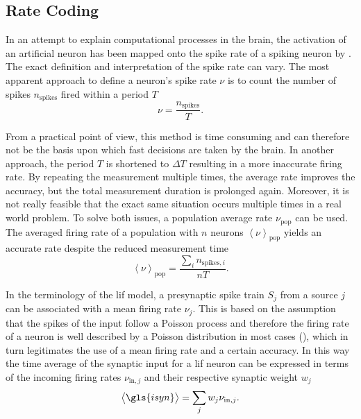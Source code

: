 \subsection{Rate Coding}
\label{ratecoding}
In an attempt to explain computational processes in the brain, the activation of an artificial neuron has been mapped onto the spike rate of a spiking neuron by \citealp{rieke1999spikes}. The exact definition and interpretation of the spike rate can vary. The most apparent approach to define a neuron's spike rate $\nu$ is to count the number of spikes $n_\text{spikes}$ fired within a period $T$
\begin{equation*}
\nu = \frac{n_\text{spikes}}{T}.
\label{eqratecoding}
\end{equation*}


From a practical point of view, this method is time consuming and can therefore not be the basis upon which fast decisions are taken by the brain. In another approach, the period $T$ is shortened to $\Delta T$ resulting in a more inaccurate firing rate. By repeating the measurement multiple times, the average rate improves the accuracy, but the total measurement duration is prolonged again. Moreover, it is not really feasible that the exact same situation occurs multiple times in a real world problem. To solve both issues, a population average rate $\nu_\text{pop}$ can be used. The averaged firing rate of a population with $n$ neurons $\left\langle\nu \right\rangle_\text{pop}$ yields an accurate rate despite the reduced measurement time
\begin{equation*}
\left\langle\nu \right\rangle_\text{pop} = \frac{\sum_i n_{\text{spikes},i}}{nT}.
\end{equation*}

In the terminology of the \gls{lif} model, a presynaptic spike train $S_j$ from a source $j$ can be associated with a mean firing rate $\nu_j$. This is based on the assumption that the spikes of the input follow a Poisson process and therefore the firing rate of a neuron is well described by a Poisson distribution in most cases (\citealp{averbeck2009poisson}), which in turn legitimates the use of a mean firing rate and a certain accuracy. In this way the time average of the synaptic input for a \gls{lif} neuron can be expressed in terms of the incoming firing rates $\nu_{\text{in}, j}$ and their respective synaptic weight $w_j$
\begin{equation*}
\left\langle \gls{isyn} \right\rangle = \sum_j w_j \nu_{\text{in}, j}.
\end{equation*}

